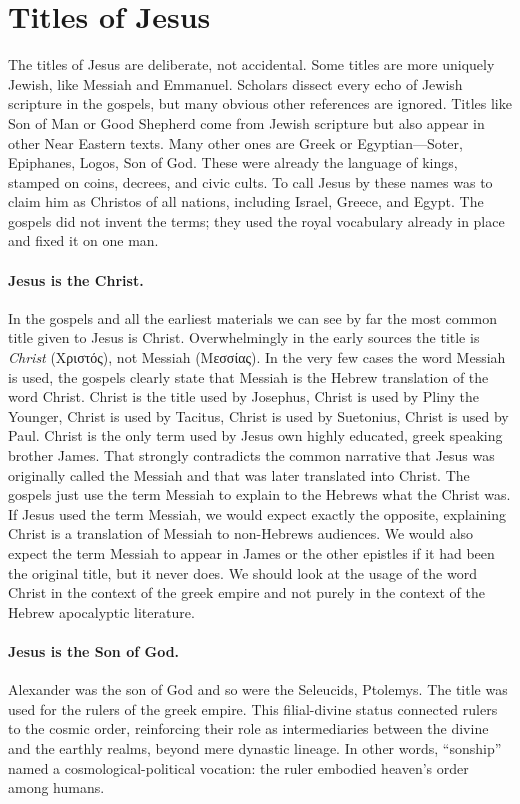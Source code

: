 \section{Titles of Jesus}\label{sec:titles-of-jesus}

The titles of Jesus are deliberate, not accidental.
Some titles are more uniquely Jewish, like Messiah and Emmanuel.
Scholars dissect every echo of Jewish scripture in the gospels, but many obvious other references are ignored.
Titles like Son of Man or Good Shepherd come from Jewish scripture but also appear in other Near Eastern texts.
Many other ones are Greek or Egyptian---Soter, Epiphanes, Logos, Son of God.
These were already the language of kings, stamped on coins, decrees, and civic cults.
To call Jesus by these names was to claim him as Christos of all nations, including Israel, Greece, and Egypt.
The gospels did not invent the terms; they used the royal vocabulary already in place and fixed it on one man.

\paragraph{Jesus is the Christ.}\label{par:jesus-is-the-christ.}
In the gospels and all the earliest materials we can see by far the most common title given to Jesus is Christ.
Overwhelmingly in the early sources the title is \emph{Christ} (Χριστός), not Messiah (Μεσσίας).
In the very few cases the word Messiah is used, the gospels clearly state that Messiah is the Hebrew translation of the word Christ.
Christ is the title used by Josephus, Christ is used by Pliny the Younger, Christ is used by Tacitus, Christ is used by Suetonius, Christ is used by Paul.
Christ is the only term used by Jesus own highly educated, greek speaking brother James.
That strongly contradicts the common narrative that Jesus was originally called the Messiah and that was later translated into Christ.
The gospels just use the term Messiah to explain to the Hebrews what the Christ was.
If Jesus used the term Messiah, we would expect exactly the opposite, explaining Christ is a translation of Messiah to non-Hebrews audiences.
We would also expect the term Messiah to appear in James or the other epistles if it had been the original title, but it never does.
We should look at the usage of the word Christ in the context of the greek empire and not purely in the context of the Hebrew apocalyptic literature.

\paragraph{Jesus is the Son of God.}\label{par:jesus-is-the-son-of-god.}
Alexander was the son of God and so were the Seleucids, Ptolemys.
The title was used for the rulers of the greek empire.
This filial-divine status connected rulers to the cosmic order, reinforcing their role as intermediaries between the divine and the earthly realms, beyond mere dynastic lineage.
In other words, “sonship” named a cosmological-political vocation: the ruler embodied heaven’s order among humans.

